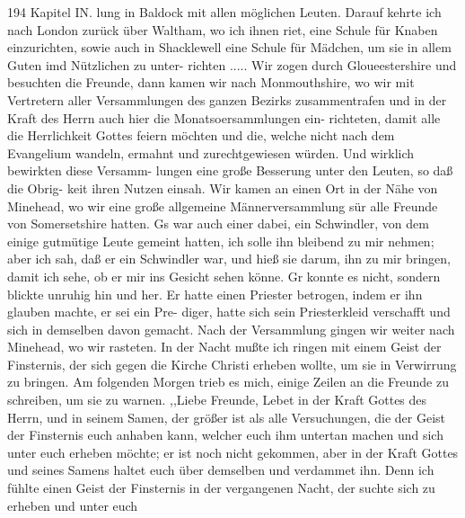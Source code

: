 194 Kapitel IN.
lung in Baldock mit allen möglichen Leuten. Darauf kehrte ich
nach London zurück über Waltham, wo ich ihnen riet, eine Schule
für Knaben einzurichten, sowie auch in Shacklewell eine Schule
für Mädchen, um sie in allem Guten imd Nützlichen zu unter-
richten .....
Wir zogen durch Gloueestershire und besuchten die Freunde,
dann kamen wir nach Monmouthshire, wo wir mit Vertretern
aller Versammlungen des ganzen Bezirks zusammentrafen und in
der Kraft des Herrn auch hier die Monatsoersammlungen ein-
richteten, damit alle die Herrlichkeit Gottes feiern möchten und
die, welche nicht nach dem Evangelium wandeln, ermahnt und
zurechtgewiesen würden. Und wirklich bewirkten diese Versamm-
lungen eine große Besserung unter den Leuten, so daß die Obrig-
keit ihren Nutzen einsah.
Wir kamen an einen Ort in der Nähe von Minehead, wo
wir eine große allgemeine Männerversammlung sür alle Freunde
von Somersetshire hatten. Gs war auch einer dabei, ein
Schwindler, von dem einige gutmütige Leute gemeint hatten, ich
solle ihn bleibend zu mir nehmen; aber ich sah, daß er ein
Schwindler war, und hieß sie darum, ihn zu mir bringen, damit
ich sehe, ob er mir ins Gesicht sehen könne. Gr konnte es
nicht, sondern blickte unruhig hin und her. Er hatte einen
Priester betrogen, indem er ihn glauben machte, er sei ein Pre-
diger, hatte sich sein Priesterkleid verschafft und sich in demselben
davon gemacht.
Nach der Versammlung gingen wir weiter nach Minehead,
wo wir rasteten. In der Nacht mußte ich ringen mit einem
Geist der Finsternis, der sich gegen die Kirche Christi erheben
wollte, um sie in Verwirrung zu bringen. Am folgenden Morgen
trieb es mich, einige Zeilen an die Freunde zu schreiben, um sie
zu warnen.
,,Liebe Freunde,
Lebet in der Kraft Gottes des Herrn, und in seinem Samen,
der größer ist als alle Versuchungen, die der Geist der Finsternis
euch anhaben kann, welcher euch ihm untertan machen und sich
unter euch erheben möchte; er ist noch nicht gekommen, aber in
der Kraft Gottes und seines Samens haltet euch über demselben
und verdammet ihn. Denn ich fühlte einen Geist der Finsternis in
der vergangenen Nacht, der suchte sich zu erheben und unter euch


